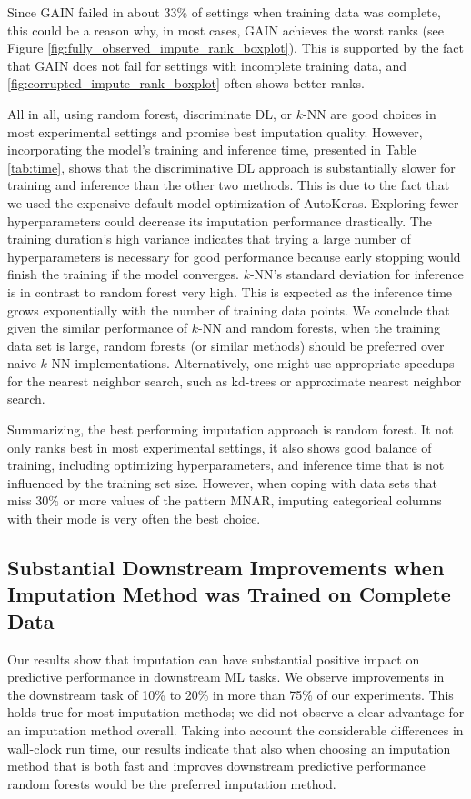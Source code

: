 Since GAIN failed in about $33\%$ of settings when training data was complete, this could be a reason why, in most cases, GAIN achieves the worst ranks (see Figure \ref{fig:fully_observed_impute_rank_boxplot}). This is supported by the fact that GAIN does not fail for settings with incomplete training data, and \ref{fig:corrupted_impute_rank_boxplot} often shows better ranks.

All in all, using random forest, discriminate DL, or $k$-NN are good choices in most experimental settings and promise best imputation quality. However, incorporating the model's training and inference time, presented in Table \ref{tab:time}, shows that the discriminative DL approach is substantially slower for training and inference than the other two methods. This is due to the fact that we used the expensive default model optimization of AutoKeras. Exploring fewer hyperparameters could decrease its imputation performance drastically. The training duration's high variance indicates that trying a large number of hyperparameters is necessary for good performance because early stopping would finish the training if the model converges. $k$-NN's standard deviation for inference is in contrast to random forest very high. This is expected as the inference time grows exponentially with the number of training data points. We conclude that given the similar performance of $k$-NN and random forests, when the training data set is large, random forests (or similar methods) should be preferred over naive $k$-NN implementations. Alternatively, one might use appropriate speedups for the nearest neighbor search, such as kd-trees or approximate nearest neighbor search.

Summarizing, the best performing imputation approach is random forest. It not only ranks best in most experimental settings, it also shows good balance of training, including optimizing hyperparameters, and inference time that is not influenced by the training set size. However, when coping with data sets that miss $30\%$ or more values of the pattern MNAR, imputing categorical columns with their mode is very often the best choice.


\subsection{Substantial Downstream Improvements when Imputation Method was Trained on Complete Data}
%
Our results show that imputation can have substantial positive impact on predictive performance in downstream ML tasks. We observe improvements in the downstream task of 10\% to 20\% in more than 75\% of our experiments. This holds true for most imputation methods; we did not observe a clear advantage for an imputation method overall. Taking into account the considerable differences in wall-clock run time, our results indicate that also when choosing an imputation method that is both fast and improves downstream predictive performance random forests would be the preferred imputation method.

